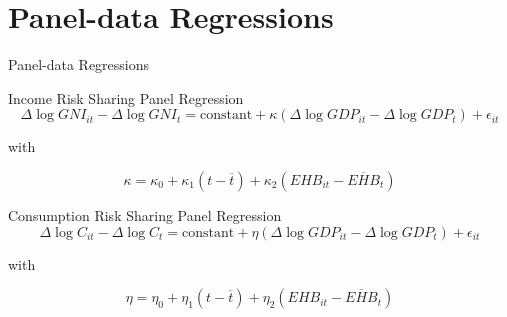 \documentclass[aspectratio=169, 10pt]{beamer}
\begin{document}
\section{Panel-data Regressions}
\begin{frame}{Panel-data Regressions}
  \begin{block}{Income Risk Sharing Panel Regression}
  \begin{equation}\label{eq:gni_panel}
    \Delta \log GNI_{it} - \Delta \log GNI_t
    =
    \text{constant}
    +
    \kappa
    \left(
    \Delta \log GDP_{it} - \Delta \log GDP_t
    \right)
    +
    \epsilon_{it}
  \end{equation}

  with

  \begin{equation}\label{eq:kappa_gni}
    \kappa
    =
    \kappa_0
    +
    \kappa_1(t - \overline{t})
    +
    \kappa_2(EHB_{it} - \overline{EHB}_t)
  \end{equation}
  \end{block}

  \begin{block}{Consumption Risk Sharing Panel Regression}
  \begin{equation}\label{eq:cons_panel}
    \Delta \log C_{it} - \Delta \log C_t
    =
    \text{constant}
    +
    \eta
    \left(
    \Delta \log GDP_{it} - \Delta \log GDP_t
    \right)
    +
    \epsilon_{it}
  \end{equation}

  with

  \begin{equation}\label{eq:eta_cons}
    \eta
    =
    \eta_0
    +
    \eta_1(t - \overline{t})
    +
    \eta_2(EHB_{it} - \overline{EHB}_t)
  \end{equation}
  \end{block}
\end{frame}
\end{document}
